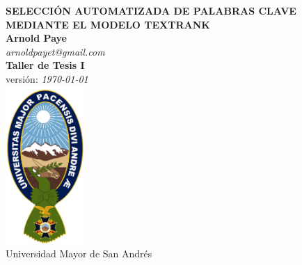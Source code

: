 \begin{titlepage}
	\vspace{3.0cm}
	\begin{center}
		{\huge\bfseries SELECCI\'ON AUTOMATIZADA DE PALABRAS CLAVE
		MEDIANTE EL MODELO TEXTRANK} \\
		\vspace{1.5cm}
		{\Large\bfseries Arnold Paye} \\ [5pt]
		\emph {arnoldpayet@gmail.com} \\[5pt]
		{\small\bfseries Taller de Tesis I} \\
		{\small versi\'on: \emph \today\ } \\
		\vspace{1.5cm}
		\includegraphics[width=3cm,height=6cm]{recursos/img/logo_umsa.png} \\
		{Universidad Mayor de San Andr\'es} 
	\end{center}
\end{titlepage}
